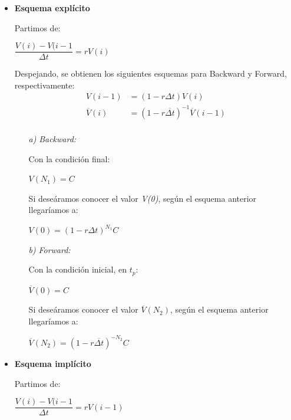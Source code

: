 \documentclass[titlepage]{article}
\begin{document}
\begin{itemize}
	\item \textbf{Esquema explícito}

	\vspace{5pt}
	Partimos de:
		\begin{center}
			$\dfrac{V(i) - V(i-1}{\Delta t} = r V(i)$
		\end{center}
	
	Despejando, se obtienen los siguientes esquemas para Backward y Forward, respectivamente:
		\begin{align*}
			V(i - 1) &= (1 - r \Delta t)V(i) \\
			\overline{V}(i) &= (1 - r \overline{\Delta t})^{-1} \overline{V}(i - 1) \\
		\end{align*}
		
		\begin{itemize}
			\item[\textit{a)}] \textit{Backward:}
			
			\vspace{5pt}
			Con la condición final:
				\begin{center}
					$V(N_{1}) = C$
				\end{center}
			Si deseáramos conocer el valor \textit{V(0)}, según el esquema anterior llegaríamos a:
				\begin{center}
					$V(0) = (1 - r \Delta t)^{N_{1}} C$
				\end{center}
			
			\item[\textit{b)}] \textit{Forward:}
			
			\vspace{5pt}
			Con la condición inicial, en $t_{p}$:
				\begin{center}
					$\overline{V}(0) = C$
				\end{center}
			Si deseáramos conocer el valor $\overline{V}(N_{2})$, según el esquema anterior llegaríamos a:
				\begin{center}
					$\overline{V}(N_{2}) = (1 - r \overline{\Delta t})^{-N_{2}} C$
				\end{center}
		\end{itemize}
		
	\item \textbf{Esquema implícito}

	\vspace{5pt}
	Partimos de:
		\begin{center}
			$\dfrac{V(i) - V(i-1}{\Delta t} = r V(i-1)$
		\end{center}
	

\end{itemize}
\end{document}
